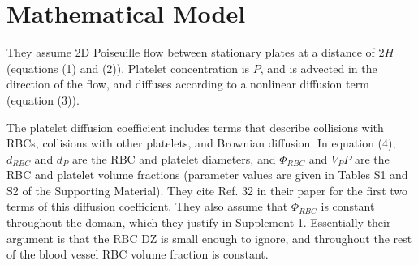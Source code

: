 \documentclass[
10pt, %
letterpaper, %
twocolumn, %
landscape %
]{article}
\begin{document}

\section{Mathematical Model} %

They assume 2D Poiseuille flow between stationary plates at a distance
of $2H$ (equations (1) and (2)).
Platelet concentration is $P$, and is advected in the direction of the
flow, and diffuses according to a nonlinear diffusion term (equation (3)).

The platelet diffusion coefficient includes terms that describe
collisions with RBCs, collisions with other platelets, and Brownian
diffusion.
In equation (4), $d_\textit{RBC}$ and $d_P$ are the RBC and platelet
diameters, and $\Phi_\textit{RBC}$ and $V_P P$ are the RBC and
platelet volume fractions (parameter values are given in Tables S1 and
S2 of the Supporting Material). They cite Ref. 32 in their paper for
the first two terms of this diffusion coefficient. They also assume
that $\Phi_\textit{RBC}$ is constant throughout the domain, which they
justify in Supplement 1. Essentially their argument is that the RBC DZ
is small enough to ignore, and throughout the rest of the blood vessel
RBC volume fraction is constant.
\end{document}
